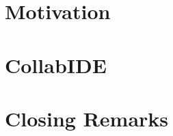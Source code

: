 \documentclass[10pt, conference, draft]{IEEEtran}
\begin{document}
\IEEEpeerreviewmaketitle


\section{Motivation}
\label{sec:motivation}


\section{CollabIDE}
\label{sec:collab-ide}


\section{Closing Remarks}
\label{sec:conclusion}





%


  
\end{document}
